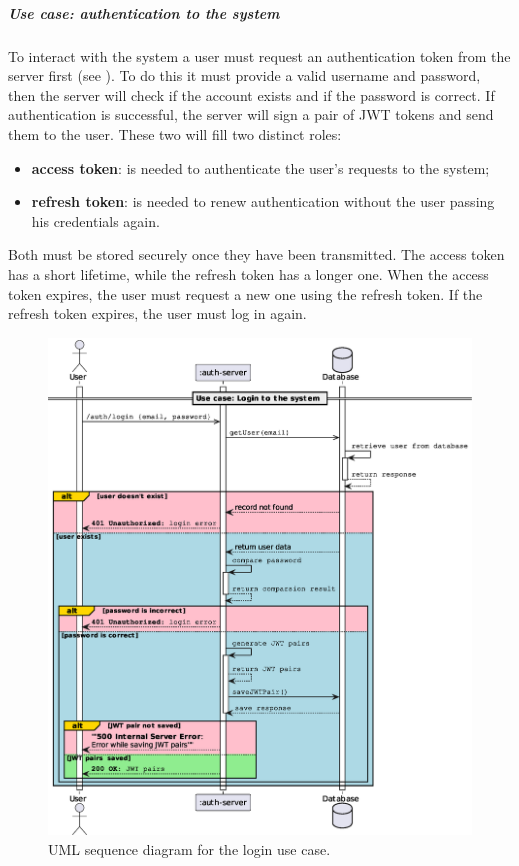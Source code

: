 \documentclass{scrartcl}
\begin{document}
\subparagraph*{Use case: authentication to the system}
\label{uc:auth-to-the-system} 
To interact with the system a user must request an authentication token from the server first (see ). To do this it must provide a valid username and password, then the server will check if the account exists and if the password is correct.
If authentication is successful, the server will sign a pair of JWT tokens and send them to the user. These two will fill two distinct roles:
\begin{itemize}
    \item \textbf{access token}: is needed to authenticate the user's requests to the system;
    \item \textbf{refresh token}: is needed to renew authentication without the user passing his credentials again.
\end{itemize}
Both must be stored securely once they have been transmitted. The access token has a short lifetime, while the refresh token has a longer one. When the access token expires, the user must request a new one using the refresh token. If the refresh token expires, the user must log in again.

\begin{figure}
    \centering
    \includegraphics[width=\linewidth]{figures/login-to-the-system.eps}
    \caption{UML sequence diagram for the login use case.}
    \label{fig:login-to-the-system} 
\end{figure}
\end{document}
